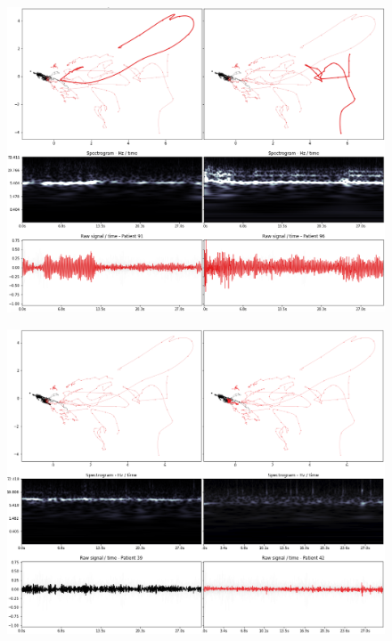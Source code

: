 \begin{figure}[ht]
\centering
\includegraphics[width=\linewidth]{figures/nemo/exp1-9196.png}
\caption{}
\label{fig:exp1-9196}
\end{figure}

\begin{figure}[ht]
\centering
\includegraphics[width=\linewidth]{figures/nemo/exp1-3942.png}
\caption{}
\label{fig:exp1-3942}
\end{figure}


